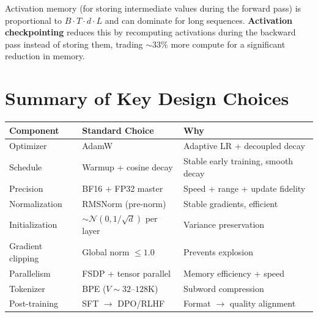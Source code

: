 \documentclass[main.tex]{subfiles}
\begin{document}
Activation memory (for storing intermediate values during the forward pass) is proportional to $B \cdot T \cdot d \cdot L$ and can dominate for long sequences. \textbf{Activation checkpointing} reduces this by recomputing activations during the backward pass instead of storing them, trading $\sim\!33\%$ more compute for a significant reduction in memory.

\needspace{0.33\textheight}
\section{Summary of Key Design Choices}

\begin{center}
\small
\renewcommand{\arraystretch}{1.4}
\begin{tabular}{l l l}
\hline
\textbf{Component} & \textbf{Standard Choice} & \textbf{Why} \\
\hline
Optimizer & AdamW & Adaptive LR + decoupled decay \\
Schedule & Warmup + cosine decay & Stable early training, smooth decay \\
Precision & BF16 + FP32 master & Speed + range + update fidelity \\
Normalization & RMSNorm (pre-norm) & Stable gradients, efficient \\
Initialization & $\sim\!\mathcal{N}(0, 1/\sqrt{d})$ per layer & Variance preservation \\
Gradient clipping & Global norm $\leq 1.0$ & Prevents explosion \\
Parallelism & FSDP + tensor parallel & Memory efficiency + speed \\
Tokenizer & BPE ($V \sim 32$--$128$K) & Subword compression \\
Post-training & SFT $\to$ DPO/RLHF & Format $\to$ quality alignment \\
\hline
\end{tabular}
\end{center}
\end{document}
